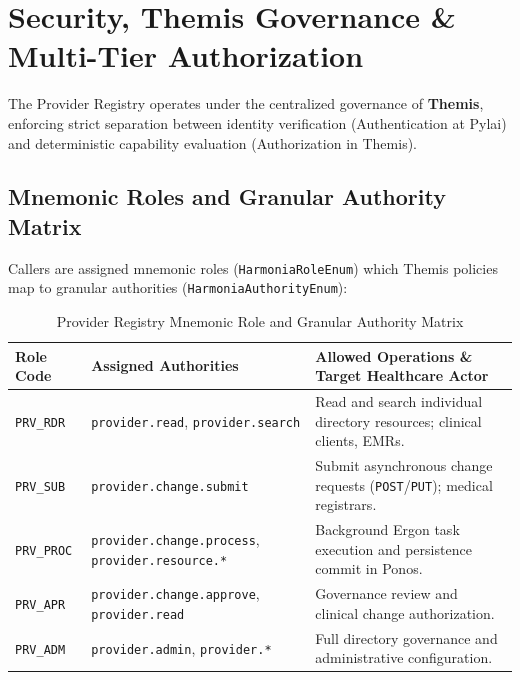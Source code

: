 \section{Security, Themis Governance \& Multi-Tier Authorization}
\label{sec:pr_security}

The Provider Registry operates under the centralized governance of \textbf{Themis}, enforcing strict separation between identity verification (Authentication at Pylai) and deterministic capability evaluation (Authorization in Themis).

\subsection{Mnemonic Roles and Granular Authority Matrix}
Callers are assigned mnemonic roles (\texttt{HarmoniaRoleEnum}) which Themis policies map to granular authorities (\texttt{HarmoniaAuthorityEnum}):

\begin{table}[htbp]
\centering
\small
\begin{tabularx}{\textwidth}{l l X}
\toprule
\textbf{Role Code} & \textbf{Assigned Authorities} & \textbf{Allowed Operations \& Target Healthcare Actor} \\
\midrule
\texttt{PRV\_RDR} & \texttt{provider.read}, \texttt{provider.search} & Read and search individual directory resources; clinical clients, EMRs. \\
\texttt{PRV\_SUB} & \texttt{provider.change.submit} & Submit asynchronous change requests (\texttt{POST}/\texttt{PUT}); medical registrars. \\
\texttt{PRV\_PROC}& \texttt{provider.change.process}, \texttt{provider.resource.*} & Background Ergon task execution and persistence commit in Ponos. \\
\texttt{PRV\_APR} & \texttt{provider.change.approve}, \texttt{provider.read} & Governance review and clinical change authorization. \\
\texttt{PRV\_ADM} & \texttt{provider.admin}, \texttt{provider.*} & Full directory governance and administrative configuration. \\
\bottomrule
\end{tabularx}
\caption{Provider Registry Mnemonic Role and Granular Authority Matrix}
\label{tab:pr_rbac_matrix}
\end{table}

